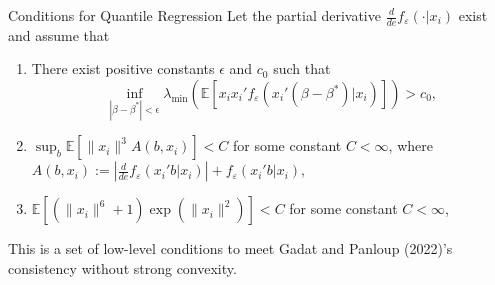 \documentclass[beamer, t]{beamer}
\begin{document}
\begin{frame}{Conditions for Quantile Regression}
	Let the partial derivative
	$\frac{d}{de}f_{\varepsilon}(\cdot|x_i)$ exist and assume that 
	\begin{enumerate}
		
		
		\item
		There exist positive constants $\epsilon$ and $c_0$ such that 
		$$
		\inf_{  | \beta-\beta^* |<\epsilon }\lambda_{\min} \left(  \mathbb E [x_ix_i'f_{\varepsilon}(x_i'(\beta-\beta^*)|x_i)] \right) > c_0,
		$$
		
		
		
		
		\item $\sup_b\mathbb E [ \|x_i\|^3A(b, x_i) ] <C$ for some constant $C < \infty$, where  $ A(b, x_i) :=   \left|\frac{d}{de}f_{\varepsilon}(x_i'b|x_i)\right| + f_{\varepsilon}(x_i'b|x_i),$ %
		
		
		\item $\mathbb E[ (\|x_i\|^6+1)\exp(\|x_i\|^2) ]<C$ for some constant $C < \infty$,
		
	\end{enumerate}
	
	\bigskip
	This is a set of low-level conditions to meet Gadat and Panloup (2022)'s consistency without strong convexity.%
	
\end{frame}
\end{document}
